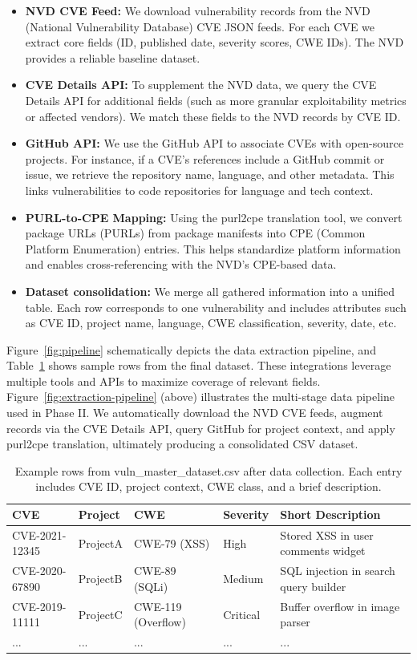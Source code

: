 \begin{itemize}
    \item \textbf{NVD CVE Feed:} We download vulnerability records from the NVD (National Vulnerability Database) CVE JSON feeds. For each CVE we extract core fields (ID, published date, severity scores, CWE IDs). The NVD provides a reliable baseline dataset.
    \item \textbf{CVE Details API:} To supplement the NVD data, we query the CVE Details API for additional fields (such as more granular exploitability metrics or affected vendors). We match these fields to the NVD records by CVE ID.
    \item \textbf{GitHub API:} We use the GitHub API to associate CVEs with open-source projects. For instance, if a CVE’s references include a GitHub commit or issue, we retrieve the repository name, language, and other metadata. This links vulnerabilities to code repositories for language and tech context.
    \item \textbf{PURL-to-CPE Mapping:} Using the purl2cpe translation tool, we convert package URLs (PURLs) from package manifests into CPE (Common Platform Enumeration) entries. This helps standardize platform information and enables cross-referencing with the NVD’s CPE-based data.
    \item \textbf{Dataset consolidation:} We merge all gathered information into a unified table. Each row corresponds to one vulnerability and includes attributes such as CVE ID, project name, language, CWE classification, severity, date, etc.
\end{itemize}


Figure~\ref{fig:pipeline} schematically depicts the data extraction pipeline, and Table~\ref{tab:vuln-dataset} shows sample rows from the final dataset. These integrations leverage multiple tools and APIs to maximize coverage of relevant fields. 
Figure~\ref{fig:extraction-pipeline} (above) illustrates the multi-stage data pipeline used in Phase II. We automatically download the NVD CVE feeds, augment records via the CVE Details API, query GitHub for project context, and apply purl2cpe translation, ultimately producing a consolidated CSV dataset. 

\begin{table}[h!]
\centering
\caption{Example rows from vuln\_master\_dataset.csv after data collection. Each entry includes CVE ID, project context, CWE class, and a brief description.}
\label{tab:vuln-dataset}
\begin{tabular}{llllp{4cm}}
\hline
\textbf{CVE} & \textbf{Project} & \textbf{CWE} & \textbf{Severity} & \textbf{Short Description} \\
\hline
CVE-2021-12345 & ProjectA & CWE-79 (XSS) & High & Stored XSS in user comments widget \\
CVE-2020-67890 & ProjectB & CWE-89 (SQLi) & Medium & SQL injection in search query builder \\
CVE-2019-11111 & ProjectC & CWE-119 (Overflow) & Critical & Buffer overflow in image parser \\
... & ... & ... & ... & ... \\
\hline
\end{tabular}
\end{table}


